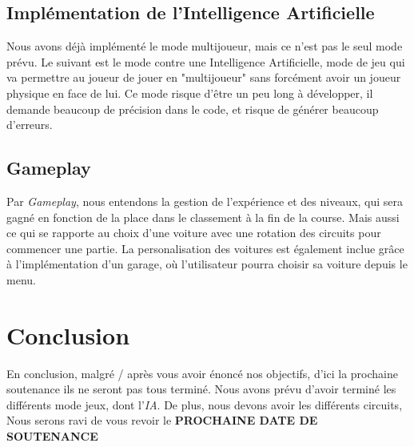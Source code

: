 \documentclass[12pt,a4paper]{article}
\newcommand{\AI}{Intelligence Artificielle}
\begin{document}
    \subsection{Implémentation de l'\AI}
        Nous avons déjà implémenté le mode multijoueur, mais ce n'est pas le seul mode prévu.
        Le suivant est le mode contre une \AI, mode de jeu qui va permettre au joueur de jouer
        en "multijoueur" sans forcément avoir un joueur physique en face de lui. Ce mode risque
        d'être un peu long à développer, il demande beaucoup de précision dans le code, et risque
        de générer beaucoup d'erreurs.

    \subsection{Gameplay}
        Par \textit{Gameplay}, nous entendons la gestion de l'expérience et des niveaux,
        qui sera gagné en fonction de la place dans le classement à la fin de la course.
        Mais aussi ce qui se rapporte au choix d'une voiture avec une rotation des circuits pour
        commencer une partie. La personalisation des voitures est également inclue grâce à 
        l'implémentation d'un garage, où l'utilisateur pourra choisir sa voiture depuis le menu.

\clearpage

\section*{Conclusion}
    En conclusion, malgré / après vous avoir énoncé nos objectifs, d'ici 
    la prochaine soutenance ils ne seront pas tous terminé. Nous avons
    prévu d'avoir terminé les différents mode jeux, dont l'\textit{IA}. 
    De plus, nous devons avoir les différents circuits, 
    Nous serons ravi de vous revoir le \textbf{PROCHAINE DATE DE SOUTENANCE}
\end{document}
